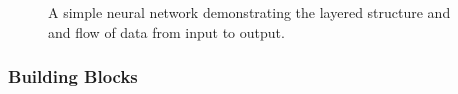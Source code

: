     \begin{figure}[h!]
    \centering
    \scalebox{.8}{}
    \caption{A simple neural network demonstrating the layered structure and
    and flow of data from input to output.}
    \label{fig:simple_nn_demo}
    \end{figure}
    \newpage
    \subsubsection{Building Blocks}

